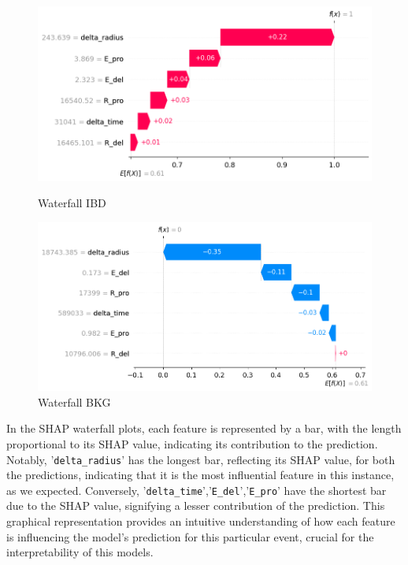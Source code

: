 \begin{figure}[h!]
	\centering
	\begin{minipage}{0.5\textwidth}
		\centering
		\includegraphics[width=\linewidth]{Images/Shap/waterfall_IBD}
		\caption{Waterfall IBD}
		\label{fig:waterfall_IBD}
	\end{minipage}%
	\begin{minipage}{0.5\textwidth}
		\centering
		\includegraphics[width=\linewidth]{Images/Shap/waterfall_BKG}
		\caption{Waterfall BKG}
		\label{fig:waterfall_BKG}
	\end{minipage}
\end{figure}

In the SHAP waterfall plots, each feature is represented by a bar, with the length proportional to its SHAP value, indicating its contribution to the prediction. Notably, '\texttt{delta\_radius}' has the longest bar, reflecting its SHAP value, for both the predictions, indicating that it is the most influential feature in this instance, as we expected. Conversely, '\texttt{delta\_time}','\texttt{E\_del}','\texttt{E\_pro}' have the shortest bar due to the SHAP value, signifying a lesser contribution of the prediction. This graphical representation provides an intuitive understanding of how each feature is influencing the model's prediction for this particular event, crucial for the interpretability of this models.\\
\newline

